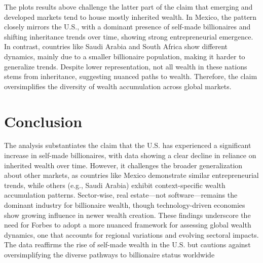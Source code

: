\documentclass[11pt,preprint]{elsarticle}
\numberwithin{equation}{section}
\numberwithin{figure}{section}
\numberwithin{table}{section}
\begin{document}
The plots results above challenge the latter part of the claim that
emerging and developed markets tend to house mostly inherited wealth. In
Mexico, the pattern closely mirrors the U.S., with a dominant presence
of self-made billionaires and shifting inheritance trends over time,
showing strong entrepreneurial emergence. In contrast, countries like
Saudi Arabia and South Africa show different dynamics, mainly due to a
smaller billionaire population, making it harder to generalize trends.
Despite lower representation, not all wealth in these nations stems from
inheritance, suggesting nuanced paths to wealth. Therefore, the claim
oversimplifies the diversity of wealth accumulation across global
markets.

\newpage

\section{Conclusion}\label{conclusion}

The analysis substantiates the claim that the U.S. has experienced a
significant increase in self-made billionaires, with data showing a
clear decline in reliance on inherited wealth over time. However, it
challenges the broader generalization about other markets, as countries
like Mexico demonstrate similar entrepreneurial trends, while others
(e.g., Saudi Arabia) exhibit context-specific wealth accumulation
patterns. Sector-wise, real estate---not software---remains the dominant
industry for billionaire wealth, though technology-driven economies show
growing influence in newer wealth creation. These findings underscore
the need for Forbes to adopt a more nuanced framework for assessing
global wealth dynamics, one that accounts for regional variations and
evolving sectoral impacts. The data reaffirms the rise of self-made
wealth in the U.S. but cautions against oversimplifying the diverse
pathways to billionaire status worldwide


\end{document}
